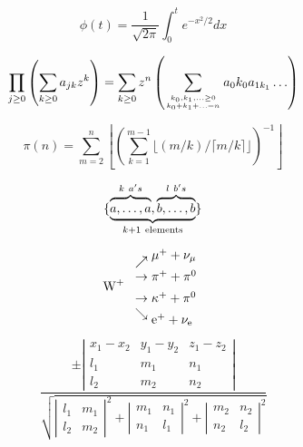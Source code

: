 \documentclass[11pt]{article}
\begin{document}
\begin{equation}
  \phi(t)=\frac{1}{\sqrt{2\pi}}
  \int^t_0 e^{-x^2/2} dx 
\end{equation}

\begin{equation}
  \prod_{j\geq 0}
  \left(\sum_{k\geq 0}a_{jk} z^k\right) 
= \sum_{k\geq 0} z^n
  \left( \sum_{{k_0,k_1,\ldots\geq 0}
          \atop{k_0+k_1+\ldots=n}    }
        a{_0k_0}a_{1k_1}\ldots  \right) 
\end{equation}

\begin{equation}
\pi(n) = \sum_{m=2}^{n}
  \left\lfloor \left(\sum_{k=1}^{m-1}
       \lfloor(m/k)/\lceil m/k\rceil 
       \rfloor \right)^{-1}
  \right\rfloor
\end{equation}

\begin{equation}
\{\underbrace{%
    \overbrace{\mathstrut a,\ldots,a}^{k\ a's},
    \overbrace{\mathstrut b,\ldots,b}^{l\ b's}}
  _{k+1\ \mathrm{elements}}                   \}
\end{equation}

\begin{displaymath}
\mbox{W}^+\
\begin{array}{l}
\nearrow\raise5pt\hbox{$\mu^+ + \nu_{\mu}$}\\
\rightarrow         \pi^+ +\pi^0         \\[5pt]
\rightarrow \kappa^+ +\pi^0              \\
\searrow\lower5pt\hbox{$\mathrm{e}^+ 
          +\nu_{\scriptstyle\mathrm{e}}$}
\end{array}
\end{displaymath}

\begin{displaymath}
\frac{\pm
\left|\begin{array}{ccc}
x_1-x_2  & y_1-y_2 & z_1-z_2 \\
l_1      & m_1     & n_1     \\
l_2      & m_2     & n_2
\end{array}\right|}{
\sqrt{\left|\begin{array}{cc}l_1&m_1\\
l_2&m_2\end{array}\right|^2
+     \left|\begin{array}{cc}m_1&n_1\\
n_1&l_1\end{array}\right|^2
+     \left|\begin{array}{cc}m_2&n_2\\
n_2&l_2\end{array}\right|^2}}
\end{displaymath}
\end{document}

